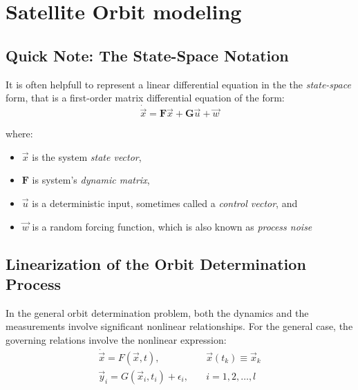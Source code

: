 \chapter{Satellite Orbit modeling}
\label{ch:satellite-orbit-modeling}

\section{Quick Note: The State-Space Notation}
It is often helpfull to represent a linear differential equation in the the
\emph{state-space} form, that is a first-order matrix differential equation of
the form:
\begin{equation}
	\dot{\vec{x}} = \bm{F} \vec{x} + \bm{G} \vec{u} + \vec{w}
\end{equation}

where:
\begin{itemize}
	\item \(\vec{x}\) is the system \emph{state vector},
	\item \(\bm{F}\) is system's \emph{dynamic matrix},
	\item \(\vec{u}\) is a deterministic input, sometimes called a \emph{control vector}, and
	\item \(\vec{w}\) is a random forcing function, which is also known as \emph{process noise}
\end{itemize}

\section{Linearization of the Orbit Determination Process}
In the general orbit determination problem, both the dynamics and the measurements
involve significant nonlinear relationships. For the general case, the governing
relations involve the nonlinear expression:
\begin{subequations}
	\begin{align}
		\dot{\vec{x}} = F( \vec{x}, t ),
		 & \quad \vec{x}(t_k ) \equiv \vec{x}_k
		\label{eq:tapley421} \\
		\vec{y}_i = G( \vec{x}_i , t_i ) + {\epsilon}_i ,
		 & \quad  i=1,2,\ldots ,l
		\label{eq:tapley422}
	\end{align}
\end{subequations}

